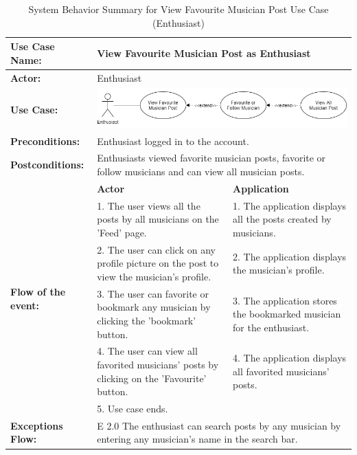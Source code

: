 \begin{longtable}{|p{3cm}|p{5cm}|p{5cm}|}
    \caption{\centering System Behavior Summary for View Favourite Musician Post Use Case (Enthusiast)} \\
    \hline
    \textbf{Use Case Name:} & \multicolumn{2}{l|}{View Favourite Musician Post as Enthusiast} \\ \hline
    \textbf{Actor:} & \multicolumn{2}{l|}{Enthusiast} \\ \hline
    \textbf{Use Case:} & \multicolumn{2}{l|}{\includegraphics[width=0.5\linewidth]{mainmatter/images/sucd11.png}} \\ \hline
    \textbf{Preconditions:} & \multicolumn{2}{p{10cm}|}{Enthusiast logged in to the account.} \\ \hline
    \textbf{Postconditions:} & \multicolumn{2}{p{10cm}|}{Enthusiasts viewed favorite musician posts, favorite or follow musicians and can view all musician posts.} \\ \hline
    \multirow{6}{3cm}{\raggedright \textbf{Flow of the event:}} & \textbf{Actor} & \textbf{Application} \\ \cline{2-3}
    & 1. The user views all the posts by all musicians on the 'Feed' page. & 1. The application displays all the posts created by musicians. \\ \cline{2-3}
    & 2. The user can click on any profile picture on the post to view the musician's profile. & 2. The application displays the musician's profile.  \\ \cline{2-3}
    & 3. The user can favorite or bookmark any musician by clicking the 'bookmark' button. & 3. The application stores the bookmarked musician for the enthusiast. \\ \cline{2-3}
    & 4. The user can view all favorited musicians’ posts by clicking on the 'Favourite' button. & 4. The application displays all favorited musicians’ posts. \\ \cline{2-3}
    & 5. Use case ends. & \\ \hline
    \multirow{1}{3cm}{\raggedright \textbf{Exceptions Flow:}} & \multicolumn{2}{p{10cm}|}{\raggedright E 2.0 The enthusiast can search posts by any musician by entering any musician's name in the search bar.} \\ \hline
\end{longtable}
\pagebreak

